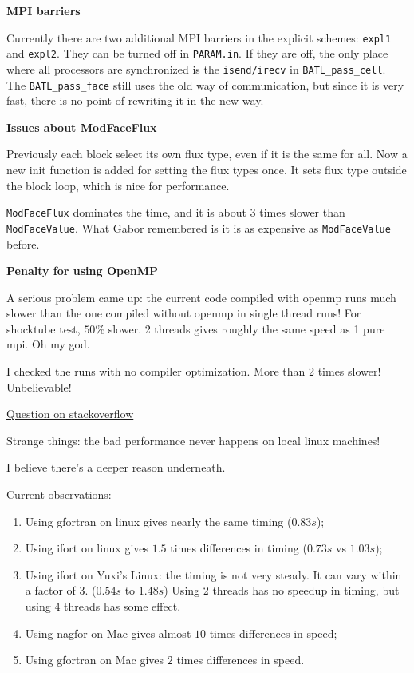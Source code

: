 \documentclass[11pt]{book} %
\begin{document}
\textbf{MPI barriers}

Currently there are two additional MPI barriers in the explicit schemes: \verb|expl1| and \verb|expl2|. They can be turned off in \verb|PARAM.in|. If they are off, the only place where all processors are synchronized is the \verb|isend/irecv| in \verb|BATL_pass_cell|. The \verb|BATL_pass_face| still uses the old way of communication, but since it is very fast, there is no point of rewriting it in the new way.

\textbf{Issues about ModFaceFlux}

Previously each block select its own flux type, even if it is the same for all. Now a new init function is added for setting the flux types once. It sets flux type outside the block loop, which is nice for performance.

\verb|ModFaceFlux| dominates the time, and it is about 3 times slower than \verb|ModFaceValue|. What Gabor remembered is it is as expensive as \verb|ModFaceValue| before.

\textbf{Penalty for using OpenMP}

A serious problem came up: the current code compiled with openmp runs much slower than the one compiled without openmp in single thread runs! For shocktube test, $50\%$ slower. 2 threads gives roughly the same speed as 1 pure mpi. Oh my god.

I checked the runs with no compiler optimization. More than 2 times slower! Unbelievable!

\href{https://stackoverflow.com/questions/31942807/do-i-need-to-disable-openmp-on-a-1-core-machine-explicitly}{Question on stackoverflow}

Strange things: the bad performance never happens on local linux machines!

I believe there's a deeper reason underneath.

Current observations:
\begin{enumerate}
\item Using gfortran on linux gives nearly the same timing ($0.83s$);
\item Using ifort on linux gives $1.5$ times differences in timing ($0.73s$ vs $1.03s$);
\item Using ifort on Yuxi's Linux: the timing is not very steady. It can vary within a factor of 3. ($0.54s$ to $1.48s$) Using 2 threads has no speedup in timing, but using 4 threads has some effect.
\item Using nagfor on Mac gives almost $10$ times differences in speed;
\item Using gfortran on Mac gives $2$ times differences in speed.
\end{enumerate}
\end{document}
